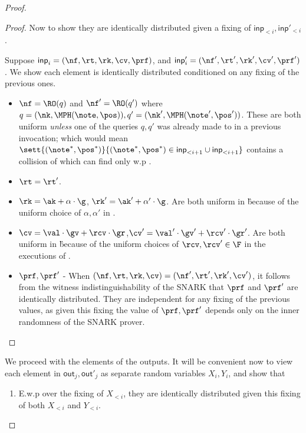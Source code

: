 \documentclass[11pt]{article}
\numberwithin{equation}{section} %
\numberwithin{figure}{section} %
\newcommand{\inp}{\ensuremath{\mathsf{inp}}\xspace}
\newcommand{\out}{\ensuremath{\mathsf{out}}\xspace}
\begin{document}
\begin{proof}
\begin{proof}
Now to show they are identically distributed given a fixing of $\inp_{<i},\inp'_{<i}$.

 Suppose $\inp_i=(\nf,\rt,\rk,\cv,\prf)$, and $\inp'_i=(\nf',\rt',\rk',\cv',\prf')$.
 We show each element is identically distributed conditioned on any fixing of the previous ones.
 \begin{itemize}
  \item  $\nf =\RO(q)$ and $\nf'=\RO(q')$ where $q=(\nk,\MPH(\note,\pos)),q'=(\nk',\MPH(\note',\pos'))$. These are both uniform \emph{unless} one of the queries $q,q'$ was already made to \RO in a previous invocation; which would mean $\sett{(\note^*,\pos^*)}{(\note^*,\pos^*)\in \inp_{<i+1}\cup\inp_{<i+1}}$ contains a collision of \MPH which \adv can find only w.p \negl.
  \item $\rt=\rt'$.
  \item $\rk=\ak + \alpha\cdot \g$, $\rk' = \ak' +\alpha'\cdot \g$. Are both uniform in \G because of the uniform choice of $\alpha,\alpha'$ in \makerandomizedtx.
  \item $\cv=\val\cdot \gv + \rcv\cdot \gr$,$\cv'=\val'\cdot \gv' + \rcv'\cdot \gr'$. Are both uniform in \G because of the uniform choices of $\rcv,\rcv'\in \F$ in the executions of \makerandomizedtx.
  \item $\prf,\prf'$ - When  $(\nf,\rt,\rk,\cv)=(\nf',\rt',\rk',\cv')$, it follows from the witness indistinguishability of the SNARK
  that $\prf$ and $\prf'$ are identically distributed. They are independent for any fixing of the previous values, as given this fixing the value
  of $\prf,\prf'$ depends only on the inner randomness of the SNARK prover.
 \end{itemize}
 
\end{proof} 
We proceed with the elements of the outputs. It will be convenient now to view each element in $\out_j,\out'_j$ as 
separate random variables $X_i,Y_i$, and show that 
 
 \begin{enumerate}
  \item 
 E.w.p \negl over the fixing of $X_{<i}$, they are identically distributed given this fixing of both $X_{<i}$ and $Y_{<i}$.
 

\end{enumerate}
\end{proof}
\end{document}
